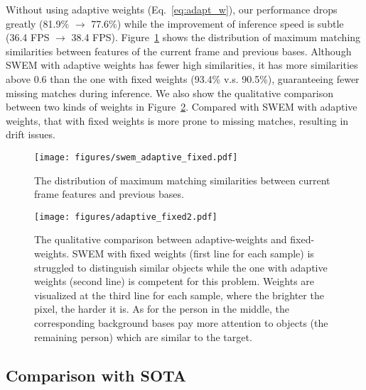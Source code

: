 Without using adaptive weights (Eq.~\ref{eq:adapt_w}), our performance drops greatly (81.9\% $\rightarrow$ 77.6\%) while the improvement of inference speed is subtle (36.4 FPS $\rightarrow$ 38.4 FPS). 
Figure~\ref{fig:ablation_w} shows the distribution of maximum matching similarities between features of the current frame and previous bases. Although SWEM with adaptive weights has fewer high similarities, it has more similarities above 0.6 than the one with fixed weights (93.4\% v.s. 90.5\%), guaranteeing fewer missing matches during inference. 
We also show the qualitative comparison between two kinds of weights in Figure~\ref{fig:ablation_wf}. Compared with SWEM with adaptive weights, that with fixed weights is more prone to missing matches, resulting in drift issues.

\begin{figure}[b]
\begin{center}
\texttt{[image: figures/swem\_adaptive\_fixed.pdf]}
\end{center}
\vspace{-0.4 cm}
   \caption{The distribution of maximum matching similarities between current frame features and previous bases.}
\label{fig:ablation_w}
\vspace{-0.5 cm}
\end{figure}

\begin{figure}[t]
\begin{center}
\texttt{[image: figures/adaptive\_fixed2.pdf]}
\end{center}
\vspace{-0.4 cm}
   \caption{The qualitative comparison between adaptive-weights and fixed-weights. SWEM with fixed weights (first line for each sample) is struggled to distinguish similar objects while {the one with} adaptive weights (second line) {is} competent for this problem. Weights are visualized at the third line for each sample, where the brighter the pixel, the harder it is. As for the person in the middle, the corresponding background bases pay more attention to objects (the remaining person) which are similar to the target.}
\label{fig:ablation_wf}
\vspace{-0.5 cm}
\end{figure}

\subsection{Comparison with SOTA}

